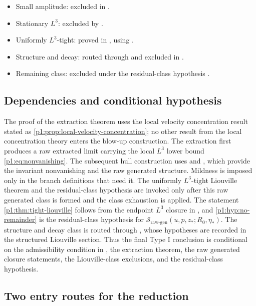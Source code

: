 \documentclass[11pt]{amsart}
\theoremstyle{plain}
\theoremstyle{definition}
\theoremstyle{remark}
\numberwithin{equation}{section}
\newcommand{\calS}{\mathcal S}
\begin{document}
\begin{itemize}[leftmargin=*,itemsep=2pt]
\item Small amplitude: excluded in .
\item Stationary \(L^3\): excluded by \cite{NRS1996}.
\item Uniformly \(L^3\)-tight: proved in , using
.
\item Structure and decay: routed through
 and excluded in
.
\item Remaining class: excluded under the residual-class hypothesis
.
\end{itemize}

\subsection{Dependencies and conditional hypothesis}

The proof of the extraction theorem uses the local velocity concentration
result stated as \cref{p1:prop:local-velocity-concentration}; no other result
from the local concentration theory enters the blow-up construction.  The
extraction first produces a raw extracted limit carrying the local \(L^3\)
lower bound \eqref{p1:eq:nonvanishing}.  The subsequent hull construction uses
 and
, which provide the invariant
nonvanishing and the raw generated structure.  Mildness is imposed only in the
branch definitions that need it.  The uniformly \(L^3\)-tight Liouville theorem and the
residual-class hypothesis are invoked only after this raw generated class is
formed and the class exhaustion is applied.  The statement
\cref{p1:thm:tight-liouville} follows from the endpoint \(L^3\) closure in
, and \cref{p1:hyp:no-remainder} is the
residual-class hypothesis for
\(\calS_{\mathrm{raw\text{-}gen}}(u,p,z_*;R_0,\eta_*)\).  The
structure and decay class is routed through
, whose hypotheses are recorded in the
structured Liouville section.  Thus the final Type I conclusion is conditional
on the admissibility condition in , the
extraction theorem, the raw generated closure statements, the Liouville-class
exclusions, and the residual-class hypothesis.

\subsection{Two entry routes for the reduction}
\label{p1:sec:two-entry-points}
\end{document}
